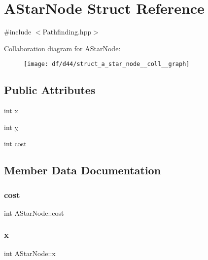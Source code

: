 \hypertarget{struct_a_star_node}{}\section{A\+Star\+Node Struct Reference}
\label{struct_a_star_node}


{\ttfamily \#include $<$Pathfinding.\+hpp$>$}



Collaboration diagram for A\+Star\+Node\+:
\nopagebreak
\begin{figure}[H]
\begin{center}
\leavevmode
\texttt{[image: df/d44/struct\_a\_star\_node\_\_coll\_\_graph]}
\end{center}
\end{figure}
\subsection*{Public Attributes}
\begin{DoxyCompactItemize}
\item 
int \mbox{\hyperlink{struct_a_star_node_a7d4d80244c6ddf6733b70c87dca1a67e}{x}}
\item 
int \mbox{\hyperlink{struct_a_star_node_a9d583c923d4a73876a348299ec54f8c0}{y}}
\item 
int \mbox{\hyperlink{struct_a_star_node_a22e16074f58bbce0b40cb2b141fec3dc}{cost}}
\end{DoxyCompactItemize}


\subsection{Member Data Documentation}
\mbox{\label{struct_a_star_node_a22e16074f58bbce0b40cb2b141fec3dc}} 
\subsubsection{\texorpdfstring{cost}{cost}}
{\footnotesize\ttfamily int A\+Star\+Node\+::cost}

\mbox{\label{struct_a_star_node_a7d4d80244c6ddf6733b70c87dca1a67e}} 
\subsubsection{\texorpdfstring{x}{x}}
{\footnotesize\ttfamily int A\+Star\+Node\+::x}

